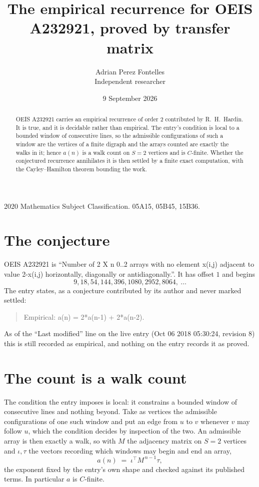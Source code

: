 \documentclass[11pt,a4paper]{article}
\title{The empirical recurrence for OEIS A232921, proved by transfer matrix}
\author{Adrian Perez Fontelles\\ \small Independent researcher}
\date{9 September 2026}
\theoremstyle{plain}
\theoremstyle{definition}
\begin{document}
\maketitle

\begin{abstract}
OEIS A232921 carries an empirical recurrence of order $2$ contributed by R.~H.~Hardin. It is
true, and it is decidable rather than empirical. The entry's condition is local to a bounded window of consecutive lines, so
the admissible configurations of such a window are the vertices of a finite digraph and the
arrays counted are exactly the walks in it; hence $a(n)$ is a walk count on $S=2$ vertices
and is $C$-finite. Whether the conjectured recurrence annihilates it is then settled by a
finite exact computation, with the Cayley--Hamilton theorem bounding the work.
\end{abstract}

\noindent\small 2020 Mathematics Subject Classification. 05A15, 05B45, 15B36.\normalsize

\section{The conjecture}

OEIS A232921 is ``Number of 2 X n 0..2 arrays with no element x(i,j) adjacent to value 2-x(i,j) horizontally, diagonally or antidiagonally.''. It has offset $1$ and begins
\[
9, 18, 54, 144, 396, 1080, 2952, 8064,\ \dots
\]
The entry states, as a conjecture contributed by its author and never marked settled:
\begin{quote}
Empirical: a(n) = 2*a(n-1) + 2*a(n-2).
\end{quote}
As of the ``Last modified'' line on the live entry (Oct 06 2018 05:30:24, revision 8) this is still
recorded as empirical, and nothing on the entry records it as proved.

\section{The count is a walk count}

The condition the entry imposes is local: it constrains a bounded window of consecutive lines and nothing beyond. Take as
vertices the admissible configurations of one such window and put an edge from $u$ to $v$
whenever $v$ may follow $u$, which the condition decides by inspection of the two. An
admissible array is then exactly a walk, so with $M$ the adjacency matrix on $S=2$ vertices
and $\iota,\tau$ the vectors recording which windows may begin and end an array,
\[
a(n)\;=\;\iota^{\!\top}M^{\,n-1}\tau ,
\]
the exponent fixed by the entry's own shape and checked against its published terms. In
particular $a$ is $C$-finite.
\end{document}
